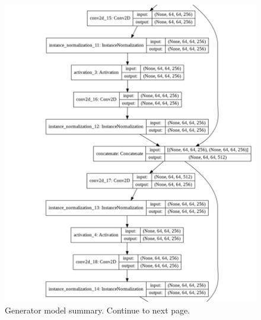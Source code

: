 \begin{figure}[H]
        \vspace*{4cm}
	    \begin{center} 
	    \includegraphics[scale=0.40]{images/Appendix/generator_2.png}
	     \caption{Generator model summary. Continue to next page.}
	    \end{center}
\end{figure}

